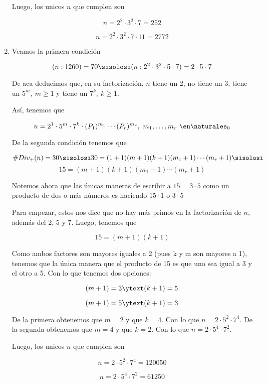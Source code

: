 \begin{enumerate}[label=(\alph*)]
        Luego, los unicos $n$ que cumplen son

        $$
          n=2^2 \cdot 3^2 \cdot 7 = \boxed{252}
        $$

        $$
          n=2^2 \cdot 3^2 \cdot 7 \cdot 11 = \boxed{2772}
        $$

  \item Veamos la primera condición

        $$
          (n:1260)=70
          \sisolosi
          (n:2^2 \cdot 3^2 \cdot 5 \cdot 7 )= 2 \cdot 5 \cdot 7
        $$

        De aca deducimos que, en su factorización, $n$ tiene un 2, no tiene un 3, tiene un $5^m, ~ m \geq 1$ y tiene un $7^k, ~ k \geq 1$. \par
        Así, tenemos que

        $$
          n = 2^1 \cdot 5^m \cdot 7^k \cdot (P_1)^{m_1} \cdots (P_r)^{m_r}, ~ m_1, \dots, m_r ~ \en \naturales_0
        $$

        De la segunda condición tenemos que

        $$
          \#Div_+(n)=30
          \sisolosi
          30 = (1+1)(m+1)(k+1)(m_1+1) \cdots (m_r+1)
          \sisolosi
        $$
        $$
          15 =(m+1)(k+1)(m_1+1) \cdots (m_r+1)
        $$

        Notemos ahora que las únicas maneras de escribir a $15=3 \cdot 5$ como un producto de dos o más números es haciendo $15 \cdot 1$ o $3 \cdot 5$ \par
        Para empezar, estos nos dice que no hay más primos en la factorización de $n$, además del 2, 5 y 7. Luego, tenemos que

        $$
          15 =(m+1)(k+1)
        $$

        Como ambos factores son mayores iguales a 2 (pues k y m son mayores a 1), tenemos que la única manera que el producto de 15 es que uno sea
        igual a 3 y el otro a 5. Con lo que tenemos dos opciones:

        $$
          (m+1)= 3 \ytext (k+1)=5
        $$

        $$
          (m+1)= 5 \ytext (k+1)=3
        $$

        De la primera obtenemos que $m= 2$ y que $k=4$. Con lo que $n=2 \cdot 5^2 \cdot 7^4$.
        De la segunda obtenemos que $m= 4$ y que $k=2$. Con lo que $n=2 \cdot 5^4 \cdot 7^2$. \bigskip

        Luego, los unicos $n$ que cumplen son

        $$
          n = 2 \cdot 5^2 \cdot 7^4 = \boxed{120050}
        $$

        $$
          n = 2 \cdot 5^4 \cdot 7^2 = \boxed{61250}
        $$

\end{enumerate}

\begin{aportes}
  \item {}
\end{aportes}
